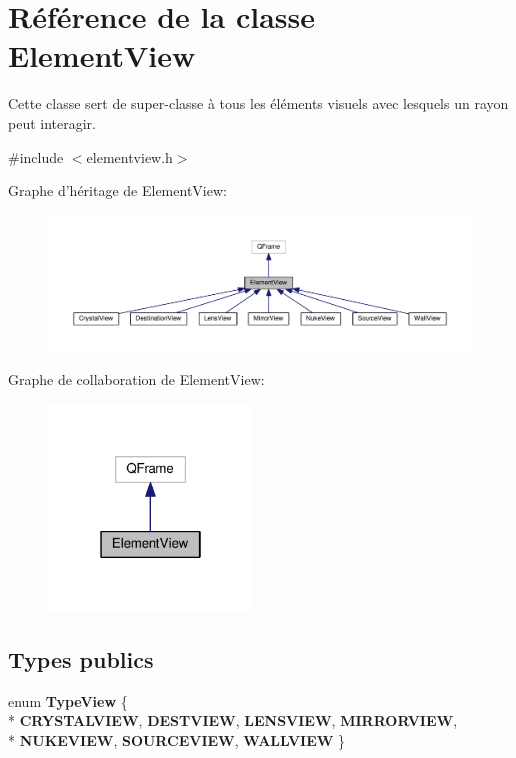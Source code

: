 \hypertarget{classElementView}{\section{Référence de la classe Element\+View}
\label{classElementView}
}


Cette classe sert de super-\/classe à tous les éléments visuels avec lesquels un rayon peut interagir.  




{\ttfamily \#include $<$elementview.\+h$>$}



Graphe d'héritage de Element\+View\+:\nopagebreak
\begin{figure}[H]
\begin{center}
\leavevmode
\includegraphics[width=350pt]{d8/d16/classElementView__inherit__graph}
\end{center}
\end{figure}


Graphe de collaboration de Element\+View\+:\nopagebreak
\begin{figure}[H]
\begin{center}
\leavevmode
\includegraphics[width=154pt]{d3/d60/classElementView__coll__graph}
\end{center}
\end{figure}
\subsection*{Types publics}
\begin{DoxyCompactItemize}
\item 
\hypertarget{classElementView_ae8b9890c6c8501a7a759896cae9ab7a6}{enum {\bfseries Type\+View} \{ \\*
{\bfseries C\+R\+Y\+S\+T\+A\+L\+V\+I\+E\+W}, 
{\bfseries D\+E\+S\+T\+V\+I\+E\+W}, 
{\bfseries L\+E\+N\+S\+V\+I\+E\+W}, 
{\bfseries M\+I\+R\+R\+O\+R\+V\+I\+E\+W}, 
\\*
{\bfseries N\+U\+K\+E\+V\+I\+E\+W}, 
{\bfseries S\+O\+U\+R\+C\+E\+V\+I\+E\+W}, 
{\bfseries W\+A\+L\+L\+V\+I\+E\+W}
 \}}\label{classElementView_ae8b9890c6c8501a7a759896cae9ab7a6}

\end{DoxyCompactItemize}

